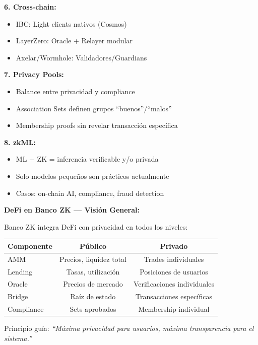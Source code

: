 \documentclass[11pt,a4paper,twoside]{book}
\begin{document}
\begin{keyidea}
\textbf{6. Cross-chain:}
\begin{itemize}
    \item IBC: Light clients nativos (Cosmos)
    \item LayerZero: Oracle + Relayer modular
    \item Axelar/Wormhole: Validadores/Guardians
\end{itemize}

\textbf{7. Privacy Pools:}
\begin{itemize}
    \item Balance entre privacidad y compliance
    \item Association Sets definen grupos ``buenos''/``malos''
    \item Membership proofs sin revelar transacci\'on espec\'ifica
\end{itemize}

\textbf{8. zkML:}
\begin{itemize}
    \item ML + ZK = inferencia verificable y/o privada
    \item Solo modelos peque\~nos son pr\'acticos actualmente
    \item Casos: on-chain AI, compliance, fraud detection
\end{itemize}
\end{keyidea}

\begin{bancozk}
\textbf{DeFi en Banco ZK --- Visi\'on General:}

Banco ZK integra DeFi con privacidad en todos los niveles:

\begin{center}
\begin{tabular}{lcc}
\toprule
\textbf{Componente} & \textbf{P\'ublico} & \textbf{Privado} \\
\midrule
AMM & Precios, liquidez total & Trades individuales \\
Lending & Tasas, utilizaci\'on & Posiciones de usuarios \\
Oracle & Precios de mercado & Verificaciones individuales \\
Bridge & Ra\'iz de estado & Transacciones espec\'ificas \\
Compliance & Sets aprobados & Membership individual \\
\bottomrule
\end{tabular}
\end{center}

Principio gu\'ia: \textit{``M\'axima privacidad para usuarios, m\'axima transparencia para el sistema.''}
\end{bancozk}
\end{document}
